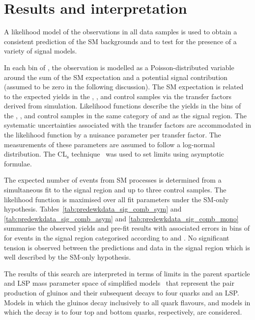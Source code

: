 \section{Results and interpretation}
\label{sec:interpretation}

A likelihood model of the observations in all data samples is
used to obtain a consistent prediction of the SM backgrounds and to
test for the presence of a variety of signal models.

In each bin of \scalht, the observation is modelled as a
Poisson-distributed variable around the sum of the SM expectation and a
potential signal contribution (assumed to be zero in the following
discussion). The SM expectation is related to the expected yields in
the \mj, \mmj, and \gj control samples via the transfer factors
derived from simulation. Likelihood functions describe the yields in the \scalht bins
of the \mj, \mmj, and \gj control samples in the same category of
\njet and \nb as the signal region. The systematic uncertainties
associated with the transfer factors are accommodated in the
likelihood function by a nuisance parameter per transfer factor. The
measurements of these parameters are assumed to follow a log-normal
distribution. The CL$_{\mathrm{s}}$ technique~\cite{read, Cowan:2010js} was used to set limits using asymptotic formulae.

The expected number of events from SM processes is determined from a
simultaneous fit to the signal region and up to three control
samples. The likelihood function is maximised over all fit parameters
under the SM-only hypothesis.
Tables~\ref{tab:predewkdata_sig_comb_sym} and \ref{tab:predewkdata_sig_comb_asym} and
\ref{tab:predewkdata_sig_comb_mono} summarise
the observed yields and pre-fit results with associated errors in bins of \scalht for events in the signal region
categorised according to \njet and \nb. 
No significant tension is observed between the predictions and data in the
signal region which is well described by the SM-only hypothesis.




\clearpage


The results of this search are interpreted in terms of limits in the
parent sparticle and LSP mass parameter space of simplified
models~\cite{Alwall:2008ag, Alwall:2008va, sms} that represent the pair production of gluinos and their subsequent decays to four quarks 
and an LSP. Models in which the gluinos decay inclusively to all quark flavours, and models in which the decay is to four top and bottom quarks, respectively, are considered. 

